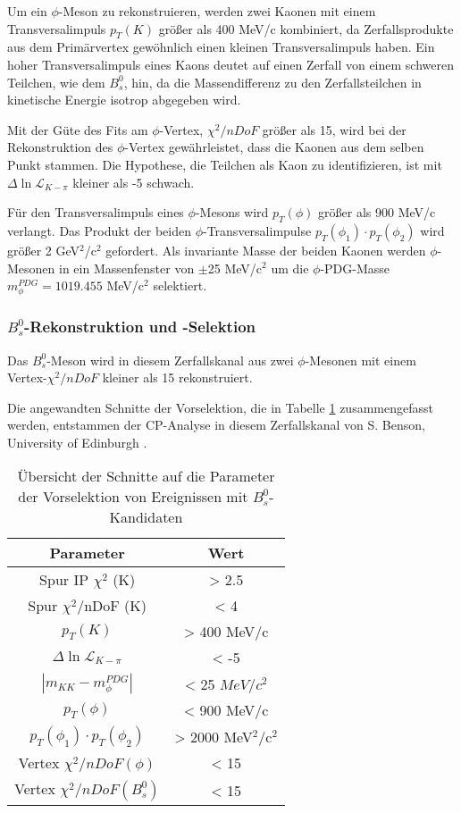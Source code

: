\documentclass{article}
\begin{document}
Um ein $\phi$-Meson zu rekonstruieren, werden zwei Kaonen mit einem Transversalimpuls $p_T(K)$ größer als 400 MeV/c kombiniert, da Zerfallsprodukte aus dem Primärvertex gewöhnlich einen kleinen Transversalimpuls haben. Ein hoher Transversalimpuls eines Kaons deutet auf einen Zerfall von einem schweren Teilchen, wie dem $B_s^0$, hin, da die Massendifferenz zu den Zerfallsteilchen in kinetische Energie isotrop abgegeben wird. 

Mit der Güte des Fits am $\phi$-Vertex, $\chi^2/nDoF$ größer als 15, wird bei der Rekonstruktion des $\phi$-Vertex gewährleistet, dass die Kaonen aus dem selben Punkt stammen. 
Die Hypothese, die Teilchen als Kaon zu identifizieren, ist mit $\Delta \ln \mathcal{L}_{K-\pi}$ kleiner als -5 schwach.

Für den Transversalimpuls eines $\phi$-Mesons wird $p_T(\phi)$ größer als 900 MeV/c verlangt. Das Produkt der beiden $\phi$-Transversalimpulse $p_{T}(\phi_1)\cdot p_{T}(\phi_2)$ wird größer 2 GeV$^2$/c$^2$ gefordert. Als invariante Masse der beiden Kaonen werden $\phi$-Mesonen in ein Massenfenster von $\pm$25 MeV/c$^2$ um die $\phi$-PDG-Masse $m_{\phi}^{PDG}=1019.455$ MeV/c$^2$ \cite{PDG} selektiert.

 
\subsubsection{$B_s^0$-Rekonstruktion und -Selektion}
Das $B_s^0$-Meson wird in diesem Zerfallskanal aus zwei $\phi$-Mesonen mit einem Vertex-$\chi^2/nDoF$ kleiner als 15 rekonstruiert. 

Die angewandten Schnitte der Vorselektion, die in Tabelle \ref{table:cutssignal} zusammengefasst werden, entstammen der CP-Analyse in diesem Zerfallskanal von S. Benson, University of Edinburgh \cite{BensonANANOTE}.


\begin{table}[h!]
\noindent \begin{centering}
\begin{tabular}{c|c} 
Parameter & Wert\tabularnewline
\hline 
Spur IP $\chi^2$ (K)  & > 2.5 \tabularnewline
Spur $\chi^2$/nDoF (K)  & < 4  \tabularnewline 
$p_T (K) $ & > 400 MeV/c \tabularnewline
$\Delta \ln \mathcal{L}_{K-\pi} $ & < -5 \tabularnewline 
$|m_{KK}-m^{PDG}_{\phi}| $ & < 25 $MeV/c^2$ \tabularnewline
$p_T (\phi) $ & < 900 MeV/c \tabularnewline
$p_{T}(\phi_1)\cdot p_{T}(\phi_2)$ & > 2000 MeV$^2$/c$^2$\tabularnewline 
Vertex $\chi^2/nDoF  (\phi) $ &  < 15 \tabularnewline
Vertex $ \chi^2/nDoF  (B_s^0) $ & < 15\tabularnewline

\end{tabular}
\par\end{centering}
\caption{Übersicht der Schnitte auf die Parameter der Vorselektion von Ereignissen mit $B_s^0$-Kandidaten}
\label{table:cutssignal}
\end{table}
\end{document}
